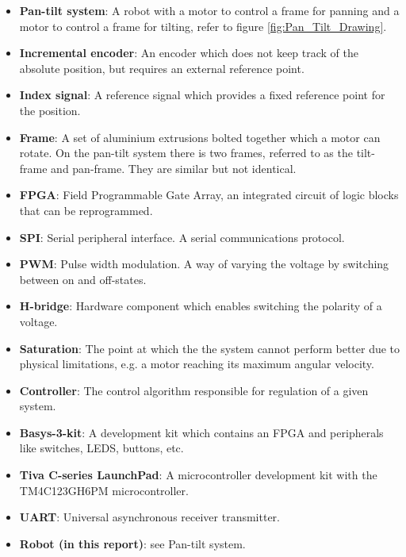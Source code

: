 \documentclass[../../main.tex]{subfiles}
\begin{document}
\label{sec:wordlist}
\begin{itemize}
    \item \textbf{Pan-tilt system}: A robot with a motor to control a frame for panning and a motor to control a frame for tilting, refer to figure \ref{fig:Pan_Tilt_Drawing}.
    \item \textbf{Incremental encoder}: An encoder which does not keep track of the absolute position, but requires an external reference point.
    \item \textbf{Index signal}: A reference signal which provides a fixed reference point for the position.
    \item \textbf{Frame}: A set of aluminium extrusions bolted together which a motor can rotate. On the pan-tilt system there is two frames, referred to as the tilt-frame and pan-frame. They are similar but not identical.
    \item \textbf{FPGA}: Field Programmable Gate Array, an integrated circuit of logic blocks that can be reprogrammed.
    \item \textbf{SPI}: Serial peripheral interface. A serial communications protocol.
    \item \textbf{PWM}: Pulse width modulation. A way of varying the voltage by switching between on and off-states.
    \item \textbf{H-bridge}: Hardware component which enables switching the polarity of a voltage.
    \item \textbf{Saturation}: The point at which the the system cannot perform better due to physical limitations, e.g. a motor reaching its maximum angular velocity.
    \item \textbf{Controller}: The control algorithm responsible for regulation of a given system.
    
    \item \textbf{Basys-3-kit}: A development kit which contains an FPGA and peripherals like switches, LEDS, buttons, etc.
    
    \item \textbf{Tiva C-series LaunchPad}: A microcontroller development kit with the TM4C123GH6PM microcontroller.
    
    
    \item \textbf{UART}: Universal asynchronous receiver transmitter.
    \item \textbf{Robot (in this report)}: see Pan-tilt system.
    

\end{itemize}
\end{document}

